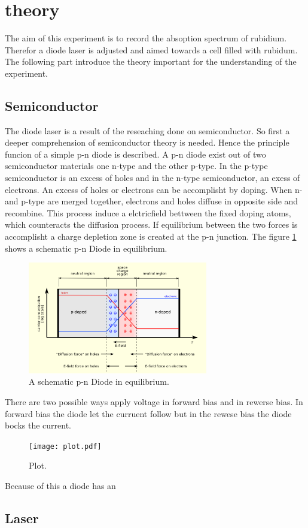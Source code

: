 \section{theory}
\label{sec:theory}
The aim of this experiment is to record the absoption spectrum
of rubidium. Therefor a diode laser is adjusted and aimed towards a cell
filled with rubidum.
The following part introduce the theory
important for the understanding of the experiment.

\subsection{Semiconductor}
\label{subsec:Semiconductor}

The diode laser is a result of the reseaching done on semiconductor.
So first a deeper comprehension of semiconductor theory is needed.
Hence the principle funcion of a simple p-n diode is described.
A p-n diode exist out of two semiconductor materials one
n-type and the other p-type.
In the p-type semiconductor is an excess of holes
and in the n-type semiconductor, an exess of electrons.
An excess of holes or electrons can be accomplisht by doping.
When n- and p-type are merged together,
electrons and holes diffuse in opposite side and recombine.
This process induce a elctricfield bettween the fixed doping atoms, which
counteracts the diffusion process.
If equilibrium between the two forces is accomplisht
a charge depletion zone is created
at the p-n junction.
The figure \ref{fig:equi} shows
a schematic p-n Diode in equilibrium.

\begin{figure}
\centering
\includegraphics[width=0.7\textwidth]{equilibrium.png}
\caption{A schematic p-n Diode in equilibrium.
\cite{wiki_diode}}
\label{fig:equi}
\end{figure}
There are two possible ways apply voltage
in forward bias and
in rewerse bias.
In forward bias the diode let the curruent follow
but in the rewese bias the diode bocks the current. 



\begin{figure}
  \centering
  \texttt{[image: plot.pdf]}
  \caption{Plot.}
  \label{fig:plot}
\end{figure}


Because of this a diode has an





\subsection{Laser}

